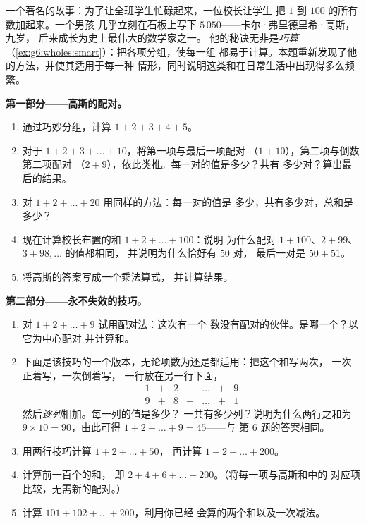 \begin{problem}
\label{pb:g6:wholes:1}
一个著名的故事：为了让全班学生忙碌起来，一位校长让学生
把 $1$ 到 $100$ 的所有数加起来。一个男孩
几乎立刻在石板上写下 $5\,050$——卡尔·弗里德里希·高斯，九岁，
后来成长为史上最伟大的数学家之一。
他的秘诀无非是\emph{巧算}
（\cref{ex:g6:wholes:smart}）：把各项分组，使每一组
都易于计算。本题重新发现了他的方法，并使其适用于每一种
情形，同时说明这类和在日常生活中出现得多么频繁。

\medskip
\noindent\textbf{第一部分——高斯的配对。}
\begin{enumerate}
  \item 通过巧妙分组，计算 $1 + 2 + 3 + 4 + 5$。
  \item 对于 $1 + 2 + 3 + \dots + 10$，将第一项与最后一项配对
        （$1 + 10$），第二项与倒数第二项配对
        （$2 + 9$），依此类推。每一对的值是多少？共有
        多少对？算出最后的结果。
  \item 对 $1 + 2 + \dots + 20$ 用同样的方法：每一对的值是
        多少，共有多少对，总和是多少？
  \item 现在计算校长布置的和 $1 + 2 + \dots + 100$：说明
        为什么配对 $1 + 100$、$2 + 99$、$3 + 98, \dots$ 的值都相同，
        并说明为什么恰好有 $50$ 对，
        最后一对是 $50 + 51$。
  \item 将高斯的答案写成一个乘法算式，
        并计算结果。
\end{enumerate}

\medskip
\noindent\textbf{第二部分——永不失效的技巧。}
\begin{enumerate}[resume]
  \item 对 $1 + 2 + \dots + 9$ 试用配对法：这次有一个
        数没有配对的伙伴。是哪一个？以它为中心配对
        并计算和。
  \item 下面是该技巧的一个版本，无论项数为还是都适用：把这个和写两次，
        一次正着写，一次倒着写，
        一行放在另一行下面，
        \[
        \begin{array}{ccccccc}
        1 & + & 2 & + & \dots & + & 9 \\
        9 & + & 8 & + & \dots & + & 1
        \end{array}
        \]
        然后\emph{逐列}相加。每一列的值是多少？
        一共有多少列？说明为什么两行之和为
        $9 \times 10 = 90$，由此可得
        $1 + 2 + \dots + 9 = 45$——与
        第 6 题的答案相同。
  \item 用两行技巧计算 $1 + 2 + \dots + 50$，
        再计算 $1 + 2 + \dots + 200$。
  \item 计算前一百个\emph{}的和，
        即 $2 + 4 + 6 + \dots + 200$。（将每一项与高斯和中的
        对应项比较，无需新的配对。）
  \item 计算 $101 + 102 + \dots + 200$，利用你已经
        会算的两个和以及一次减法。
\end{enumerate}


\end{problem}
